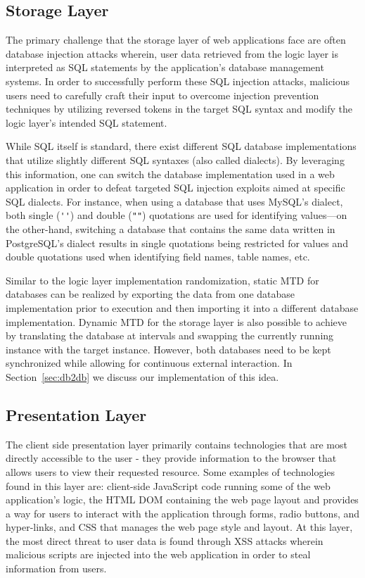 \subsection{Storage Layer}
The primary challenge that the storage layer of web applications face are often database injection attacks wherein, user data retrieved from the logic layer is interpreted as SQL statements by the application's database management systems.
In order to successfully perform these SQL injection attacks, malicious users need to carefully craft their input to overcome injection prevention techniques by utilizing reversed tokens in the target SQL syntax and modify the logic layer's intended SQL statement. %

While SQL itself is standard, there exist different SQL database implementations that utilize slightly different SQL syntaxes (also called dialects). By leveraging this information, one can switch the database implementation used in a web application in order to defeat targeted SQL injection exploits aimed at specific SQL dialects.
For instance, when using a database that uses MySQL's dialect,  both single (\verb"''") and double (\verb|""|) quotations are used for identifying values---on the other-hand, switching a database that contains the same data written in PostgreSQL's dialect results in single quotations being restricted for values and double quotations used when identifying field names, table names, etc.

Similar to the logic layer implementation randomization, static MTD for databases can be realized by exporting the data from one database implementation prior to execution and then importing it into a different database implementation.
Dynamic MTD for the storage layer is also possible to achieve by translating the database at intervals and swapping the currently running instance with the target instance. However, both databases need to be kept synchronized while allowing for continuous external interaction.
In Section~\ref{sec:db2db} we discuss our implementation of this idea.

\subsection{Presentation Layer}
The client side presentation layer primarily contains technologies that are most directly accessible to the user - they provide information to the browser that allows users to view their requested resource. Some examples of technologies found in this layer are: client-side JavaScript code running some of the web application's logic, the HTML DOM containing the web page layout and provides a way for users to interact with the application through forms, radio buttons, and hyper-links, and CSS that manages the web page style and layout. At this layer, the most direct threat to user data is found through XSS attacks wherein malicious scripts are injected into the web application in order to steal information from users. 

